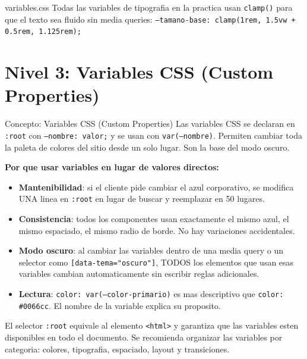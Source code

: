 \documentclass[11pt,a4paper]{article}
\begin{document}
	\begin{cajapractica}{variables.css}
		Todas las variables de tipografia en la practica usan \texttt{clamp()} para que el texto sea fluido sin media queries: \texttt{--tamano-base: clamp(1rem, 1.5vw + 0.5rem, 1.125rem);}
	\end{cajapractica}
	
	\section{Nivel 3: Variables CSS (Custom Properties)}
	
	\begin{cajaconcepto}{Concepto: Variables CSS (Custom Properties)}
		Las variables CSS se declaran en \texttt{:root} con \texttt{--nombre: valor;} y se usan con \texttt{var(--nombre)}. Permiten cambiar toda la paleta de colores del sitio desde un solo lugar. Son la base del modo oscuro.
		
		\textbf{Por que usar variables en lugar de valores directos:}
		\begin{itemize}[leftmargin=1.2em,itemsep=3pt]
			\item \textbf{Mantenibilidad}: si el cliente pide cambiar el azul corporativo, se modifica UNA linea en \texttt{:root} en lugar de buscar y reemplazar en 50 lugares.
			\item \textbf{Consistencia}: todos los componentes usan exactamente el mismo azul, el mismo espaciado, el mismo radio de borde. No hay variaciones accidentales.
			\item \textbf{Modo oscuro}: al cambiar las variables dentro de una media query o un selector como \texttt{[data-tema="oscuro"]}, TODOS los elementos que usan esas variables cambian automaticamente sin escribir reglas adicionales.
			\item \textbf{Lectura}: \texttt{color: var(---color-primario)} es mas descriptivo que \texttt{color: \#0066cc}. El nombre de la variable explica su proposito.
		\end{itemize}
		
		El selector \texttt{:root} equivale al elemento \texttt{<html>} y garantiza que las variables esten disponibles en todo el documento. Se recomienda organizar las variables por categoria: colores, tipografia, espaciado, layout y transiciones.
	\end{cajaconcepto}
	
\end{document}
